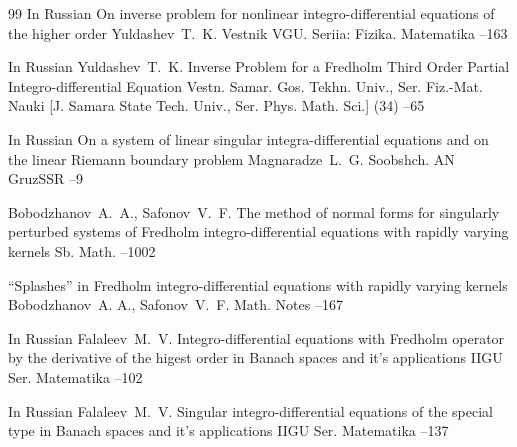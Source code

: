 {\begin{thebibliography}{99}
\lang In Russian
\paper On inverse problem for nonlinear integro-differential equations of the higher order
\by Yuldashev~T.~K.
\jour Vestnik VGU. Seriia: Fizika. Matematika
--163


\lang In Russian
\by Yuldashev~T.~K.
\paper Inverse Problem for a Fredholm Third Order Partial Integro-differential Equation
\jour Vestn. Samar. Gos. Tekhn. Univ., Ser. Fiz.-Mat. Nauki \rm [J. Samara State Tech. Univ., Ser. Phys. Math. Sci.]
(34)
--65



\lang In Russian
\paper On  a  system  of  linear singular integra-differential equations and on the 
linear Riemann boundary problem
\by Magnaradze~L.~G.
\jour Soobshch. AN GruzSSR
--9

\by Bobodzhanov~A.~A., Safonov~V.~F.
\paper The method of normal forms for singularly perturbed systems of Fredholm integro-differential equations with rapidly varying kernels
\jour Sb. Math.
--1002

\paper ``Splashes'' in Fredholm integro-differential equations with rapidly varying kernels
\by  Bobodzhanov~A. A.,  Safonov~V.~F.
\jour Math. Notes
--167

\lang In Russian
\by Falaleev~M.~V.
\paper Integro-differential equations with Fredholm operator by the derivative of the higest order in Banach spaces and it's applications
\jour IIGU Ser. Matematika
--102

\lang In Russian
\by Falaleev~M.~V.
\paper Singular integro-differential equations of the special type in Banach spaces and it's applications
\jour IIGU Ser. Matematika
--137


\end{thebibliography}}
